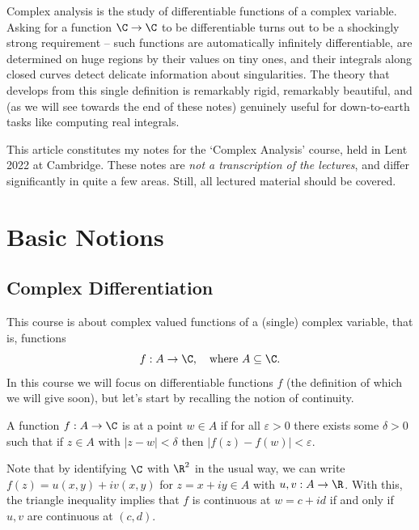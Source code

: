 



Complex analysis is the study of differentiable functions of a complex variable. Asking for a function $\C \rightarrow \C$ to be differentiable turns out to be a shockingly strong requirement -- such functions are automatically infinitely differentiable, are determined on huge regions by their values on tiny ones, and their integrals along closed curves detect delicate information about singularities. The theory that develops from this single definition is remarkably rigid, remarkably beautiful, and (as we will see towards the end of these notes) genuinely useful for down-to-earth tasks like computing real integrals.

This article constitutes my notes for the `Complex Analysis' course, held in Lent 2022 at Cambridge. These notes are \emph{not a transcription of the lectures}, and differ significantly in quite a few areas. Still, all lectured material should be covered.






\section{Basic Notions}

\subsection{Complex Differentiation}

This course is about complex valued functions of a (single) complex variable, that is, functions
$$
f:A \rightarrow \C, \quad \text{where }A \subseteq \C.
$$
In this course we will focus on differentiable functions $f$ (the definition of which we will give soon), but let's start by recalling the notion of continuity.

\begin{definition}[Continuity]
    A function $f: A \rightarrow \C$ is  at a point $w \in A$ if for all $\varepsilon > 0$ there exists some $\delta > 0$ such that if $z \in A$ with $|z - w| < \delta$ then $|f(z) - f(w)| < \varepsilon$.
\end{definition}

Note that by identifying $\C$ with $\R^2$ in the usual way, we can write
$
f(z) = u(x, y) + iv(x, y)
$
for $z = x + iy \in A$ with $u, v: A \rightarrow \R$. With this, the triangle inequality implies that $f$ is continuous at $w = c + id$ if and only if $u, v$ are continuous at $(c, d)$.

